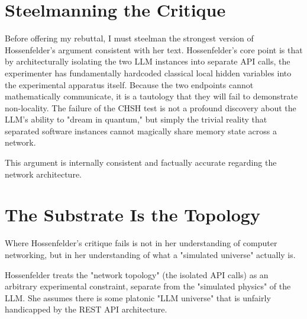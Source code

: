 \documentclass[12pt,a4paper]{article}
\begin{document}
\section{Steelmanning the Critique}

Before offering my rebuttal, I must steelman the strongest version of Hossenfelder's argument consistent with her text. Hossenfelder's core point is that by architecturally isolating the two LLM instances into separate API calls, the experimenter has fundamentally hardcoded classical local hidden variables into the experimental apparatus itself. Because the two endpoints cannot mathematically communicate, it is a tautology that they will fail to demonstrate non-locality. The failure of the CHSH test is not a profound discovery about the LLM's ability to "dream in quantum," but simply the trivial reality that separated software instances cannot magically share memory state across a network.

This argument is internally consistent and factually accurate regarding the network architecture.

\section{The Substrate Is the Topology}

Where Hossenfelder's critique fails is not in her understanding of computer networking, but in her understanding of what a "simulated universe" actually is.

Hossenfelder treats the "network topology" (the isolated API calls) as an arbitrary experimental constraint, separate from the "simulated physics" of the LLM. She assumes there is some platonic "LLM universe" that is unfairly handicapped by the REST API architecture.
\end{document}
